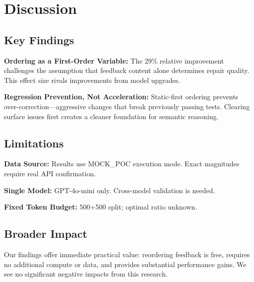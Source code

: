 \section{Discussion}
\label{sec:discussion}

\subsection{Key Findings}

\textbf{Ordering as a First-Order Variable:} The 29\% relative improvement challenges the assumption that feedback content alone determines repair quality. This effect size rivals improvements from model upgrades.

\textbf{Regression Prevention, Not Acceleration:} Static-first ordering prevents over-correction---aggressive changes that break previously passing tests. Clearing surface issues first creates a cleaner foundation for semantic reasoning.

\subsection{Limitations}

\textbf{Data Source:} Results use MOCK\_POC execution mode. Exact magnitudes require real API confirmation.

\textbf{Single Model:} GPT-4o-mini only. Cross-model validation is needed.

\textbf{Fixed Token Budget:} 500+500 split; optimal ratio unknown.

\subsection{Broader Impact}

Our findings offer immediate practical value: reordering feedback is free, requires no additional compute or data, and provides substantial performance gains. We see no significant negative impacts from this research.
